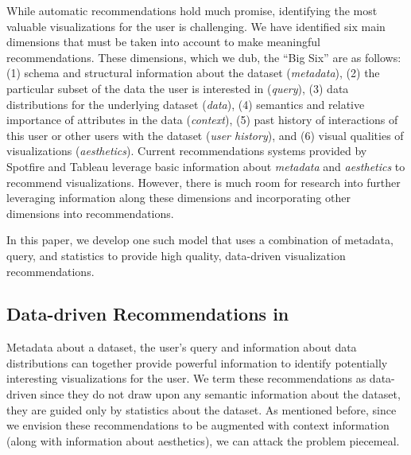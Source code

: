 While automatic recommendations hold much promise, identifying the most valuable visualizations for the user is 
challenging. 
We have identified six main dimensions that must be taken into account to make meaningful recommendations. 
These dimensions, which we dub, the ``Big Six''  are as follows:  
(1) schema and structural information about the dataset ({\it metadata}), 
(2) the particular subset of the data the user is interested in ({\it query}), 
(3) data distributions for the underlying dataset ({\it data}), 
(4) semantics and relative importance of attributes in the data ({\it context}), 
(5) past history of interactions of this user or other users with the dataset ({\it user history}), 
and (6) visual qualities of visualizations ({\it aesthetics}). 
Current recommendations systems provided by Spotfire and Tableau leverage basic information about {\it metadata}
and {\it aesthetics} to recommend visualizations. 
However, there is much room for research into further leveraging information along these dimensions and 
incorporating other dimensions into recommendations.


In this paper, we develop one such model that uses a combination of metadata, query, and statistics to 
provide high quality, data-driven visualization recommendations.

\subsection*{Data-driven Recommendations in \SeeDB}

Metadata about a dataset, the user's query and information about data distributions can together provide powerful
information to identify potentially interesting visualizations for the user.
We term these recommendations as data-driven since they do not draw upon any semantic information about the dataset,
they are guided only by statistics about the dataset.
As mentioned before, since we envision these recommendations to be augmented with context information (along with
information about aesthetics), we can attack the problem piecemeal.

